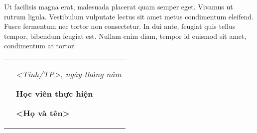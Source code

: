 Ut facilisis magna erat, malesuada placerat quam semper eget. Vivamus ut rutrum ligula. Vestibulum vulputate lectus sit amet metus condimentum eleifend. Fusce fermentum nec tortor non consectetur. In dui ante, feugiat quis tellus tempor, bibendum feugiat est. Nullam enim diam, tempor id euismod sit amet, condimentum at tortor.\par
\begin{table}[!ht]\centering
	\begin{tabular}{p{.45\linewidth}p{.5\linewidth}}
	&\centering
	\textit{<Tỉnh/TP>, ngày \the\day{} tháng \the\month{} năm \the\year{}}\par
	\textbf{Học viên thực hiện}\par
	\vspace{3cm}
	\textbf{<Họ và tên>}\par
	\end{tabular}
\end{table}
